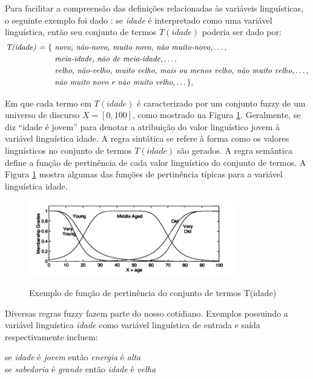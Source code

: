 Para facilitar a compreensão das definições relacionadas às variáveis linguísticas, o seguinte exemplo foi dado \cite[p.~55]{Jang1997}: se \textit{idade} é interpretado como uma variável linguística, então seu conjunto de termos $T(idade)$ poderia ser dado por:
\begin{align*}
\mbox{\textit{T(idade) = }}\{ &\mbox{ \textit{novo, não-novo, muito novo, não muito-novo,}} \dots, \\
&\mbox{ \textit{meia-idade, não de meia-idade,}} \dots, \\
&\mbox{ \textit{velho, não-velho, muito velho, mais ou menos velho, não muito velho,}} \dots, \\
&\mbox{ \textit{não muito novo e não muito velho,}} \dots \},
\end{align*}

Em que cada termo em $T(idade)$ é caracterizado por um conjunto fuzzy de um universo de discurso $X = [0,100]$, como mostrado na Figura \ref{fig:fuzzy_rules_jang}. Geralmente, se diz ``idade é jovem'' para denotar a atribuição do valor linguístico jovem à variável linguística idade. A regra sintática se refere à forma como os valores linguísticos no conjunto de termos $T(idade)$ são gerados. A regra semântica define a função de pertinência de cada valor linguístico do conjunto de termos. A Figura \ref{fig:fuzzy_rules_jang} mostra algumas das funções de pertinência típicas para a variável linguística idade.

\begin{figure}[!htb]
    \centering
    \caption{Exemplo de função de pertinência do conjunto de termos T(idade)}
    \includegraphics[width=0.8\textwidth]{./04-figuras/fund_teorica/fuzzy_rules_jang}
    \label{fig:fuzzy_rules_jang}
\end{figure}

Diversas regras fuzzy fazem parte do nosso cotidiano. Exemplos possuindo a variável linguística \textit{idade} como variável linguística de entrada e saída respectivamente incluem:
\begin{center}
se \textit{idade} é \textit{jovem} então \textit{energia} é \textit{alta} \\
se \textit{sabedoria} é \textit{grande} então \textit{idade} é \textit{velha}
\end{center}

